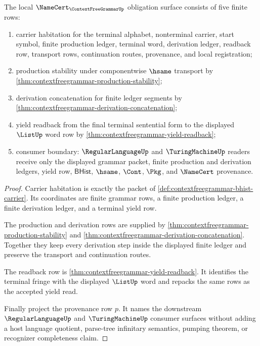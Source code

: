 \begin{theorem}
\label{thm:contextfreegrammar-namecert-obligation-surface}
The local $\NameCert_{\ContextFreeGrammarUp}$ obligation surface consists of
five finite rows:
\begin{enumerate}
\item carrier habitation for the terminal alphabet, nonterminal carrier, start
symbol, finite production ledger, terminal word, derivation ledger, readback
row, transport rows, continuation routes, provenance, and local registration;
\item production stability under componentwise $\hsame$ transport by
\autoref{thm:contextfreegrammar-production-stability};
\item derivation concatenation for finite ledger segments by
\autoref{thm:contextfreegrammar-derivation-concatenation};
\item yield readback from the final terminal sentential form to the displayed
$\ListUp$ word row by \autoref{thm:contextfreegrammar-yield-readback};
\item consumer boundary: $\RegularLanguageUp$ and $\TuringMachineUp$ readers
receive only the displayed grammar packet, finite production and derivation
ledgers, yield row, $\mathsf{BHist}$, $\hsame$, $\Cont$, $\Pkg$, and
$\NameCert$ provenance.
\end{enumerate}
\end{theorem}
\begin{proof}
Carrier habitation is exactly the packet of
\autoref{def:contextfreegrammar-bhist-carrier}. Its coordinates are finite
grammar rows, a finite production ledger, a finite derivation ledger, and a
terminal yield row.

The production and derivation rows are supplied by
\autoref{thm:contextfreegrammar-production-stability} and
\autoref{thm:contextfreegrammar-derivation-concatenation}. Together they keep
every derivation step inside the displayed finite ledger and preserve the
transport and continuation routes.

The readback row is \autoref{thm:contextfreegrammar-yield-readback}. It
identifies the terminal fringe with the displayed $\ListUp$ word and repacks
the same rows as the accepted yield read.

Finally project the provenance row $p$. It names the downstream
$\RegularLanguageUp$ and $\TuringMachineUp$ consumer surfaces without adding a
host language quotient, parse-tree infinitary semantics, pumping theorem, or
recognizer completeness claim.
\end{proof}

